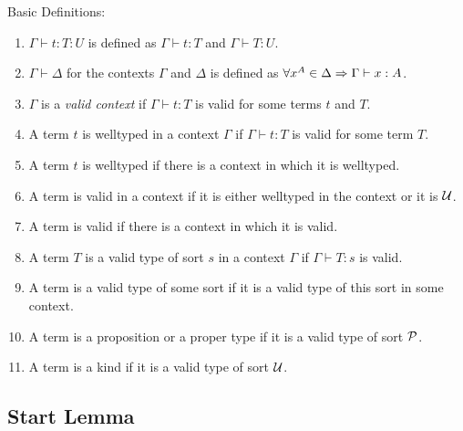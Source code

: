 \begin{definition}
    \label{BasicTypingDefinitions} Basic Definitions:

    \begin{enumerate}
    \item $\Gamma \vdash t : T : U$ is defined as $\Gamma \vdash t : T$ and
        $\Gamma \vdash T : U$.

    \item $\Gamma \vdash \Delta$ for the contexts $\Gamma$ and $\Delta$ is
        defined as $\forall x^A \in \Delta \Rightarrow \Gamma \vdash x : A$.

    \item $\Gamma$ is a \emph{valid context} if $\Gamma \vdash t : T$ is valid
        for some terms $t$ and $T$.

    \item A term $t$ is welltyped in a context $\Gamma$ if $\Gamma \vdash t : T$
        is valid for some term $T$.

    \item A term $t$ is welltyped if there is a context in which it is
        welltyped.

    \item A term is valid in a context if it is either welltyped in the context
        or it is ${\cal U}$.

    \item A term is valid if there is a context in which it is valid.

    \item A term $T$ is a valid type of sort $s$ in a context $\Gamma$ if
        $\Gamma \vdash T : s$ is valid.

    \item A term is a valid type of some sort if it is a valid type of this sort
        in some context.

    \item A term is a proposition or a proper type if it is a valid type of sort
        ${\cal P}$.

    \item A term is a kind if it is a valid type of sort ${\cal U}$.
    \end{enumerate}
\end{definition}


\subsection{Start Lemma}

